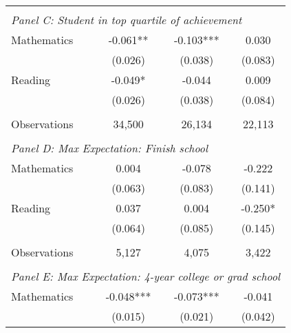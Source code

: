 {\begin{tabular}{lccc}
&  &  &   \\
\multicolumn{4}{l}{\textit{Panel C: Student in top quartile of achievement}} \\
\hspace{3mm}Mathematics&      -0.061** &      -0.103***&       0.030   \\
                    &     (0.026)   &     (0.038)   &     (0.083)   \\
 
\hspace{3mm}Reading &      -0.049*  &      -0.044   &       0.009   \\
                    &     (0.026)   &     (0.038)   &     (0.084)   \\
                    &               &               &               \\
\hspace{3mm}Observations&      34,500   &      26,134   &      22,113   \\
 
&  &  &   \\
\multicolumn{4}{l}{\textit{Panel D: Max Expectation: Finish school}} \\
\hspace{3mm}Mathematics&       0.004   &      -0.078   &      -0.222   \\
                    &     (0.063)   &     (0.083)   &     (0.141)   \\
 
\hspace{3mm}Reading &       0.037   &       0.004   &      -0.250*  \\
                    &     (0.064)   &     (0.085)   &     (0.145)   \\
                    &               &               &               \\
\hspace{3mm}Observations&       5,127   &       4,075   &       3,422   \\
 
&  &  &   \\
\multicolumn{4}{l}{\textit{Panel E: Max Expectation: 4-year college or grad school}} \\
\hspace{3mm}Mathematics&      -0.048***&      -0.073***&      -0.041   \\
                    &     (0.015)   &     (0.021)   &     (0.042)   \\
 

\end{tabular}}
